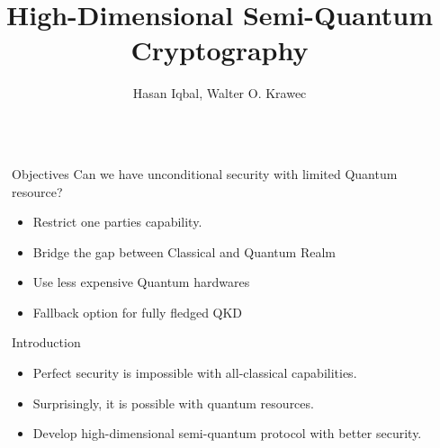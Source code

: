 \documentclass[final]{beamer}
\title{High-Dimensional Semi-Quantum Cryptography} %
\author{Hasan Iqbal, Walter O. Krawec} %
\institute{Computer Science and Engineering, UConn} %
\newlength{\sepwid}
\newlength{\onecolwid}
\begin{document}

\setlength{\belowcaptionskip}{2ex} %
\setlength\belowdisplayshortskip{2ex} %

\begin{frame}[t] %

\begin{columns}[t] %

\begin{column}{\sepwid}\end{column} %

\begin{column}{\onecolwid} %


\begin{alertblock}{Objectives}
Can we have unconditional security with limited Quantum resource?
\begin{itemize}
\item Restrict one parties capability. 
\item Bridge the gap between Classical and Quantum Realm
\item Use less expensive Quantum hardwares
\item Fallback option for fully fledged QKD
\end{itemize}

\end{alertblock}


\begin{block}{Introduction}

\begin{itemize}
\item Perfect security is impossible with all-classical capabilities. 
\item Surprisingly, it is possible with quantum resources. 
\item Develop high-dimensional semi-quantum protocol with better security. 
\end{itemize}


\end{block}
\end{column}
\end{columns}
\end{frame}
\end{document}
